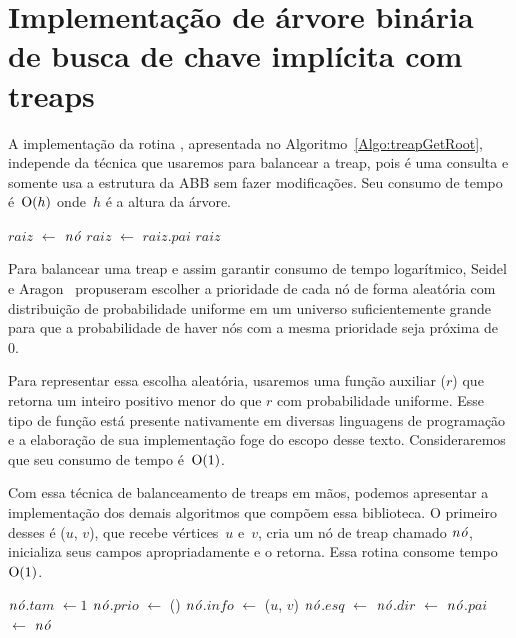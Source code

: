 \section{Implementação de árvore binária de busca de chave implícita com treaps}
\label{sec:imple-treap}
A implementação da rotina \treapGetRoot{}, apresentada no Algoritmo~\ref{Algo:treapGetRoot}, independe da técnica que usaremos para balancear a treap,
pois é uma consulta e somente usa a estrutura da ABB sem fazer modificações.
Seu consumo de tempo é~$\mathrm{O}(h)$ onde~$h$ é a altura da árvore.

\begin{algorithm}[htb]
\caption{\treapGetRoot($\node$)}
\label{Algo:treapGetRoot}
\begin{algorithmic}[1]
\State $raiz$ $\gets$ $\node$
\State  $raiz$ $\gets$  $raiz$.$pai$
\EndWhile
\State \Return $raiz$
\end{algorithmic}
\end{algorithm}

Para balancear uma treap e assim garantir consumo de tempo logarítmico, Seidel e Aragon~\cite{AragonSeidel1996} propuseram escolher a prioridade de cada nó de forma aleatória com distribuição de probabilidade uniforme em um universo suficientemente grande para que a probabilidade de haver nós com a mesma prioridade seja próxima de~$0$.

Para representar essa escolha aleatória, usaremos uma função auxiliar \random($r$) que retorna um inteiro positivo menor do que $r$ com probabilidade uniforme. Esse tipo de função está presente nativamente em diversas linguagens de programação e a elaboração de sua implementação foge do escopo desse texto. Consideraremos que seu consumo de tempo é~$\mathrm{O}(1)$.

Com essa técnica de balanceamento de treaps em mãos, podemos apresentar a implementação dos demais algoritmos que compõem essa biblioteca.
O primeiro desses é \treapCreate($u$, $v$), que recebe vértices~$u$ e~$v$, cria um nó de treap chamado $\node$, inicializa seus campos apropriadamente e o retorna.
Essa rotina consome tempo~$\mathrm{O}(1)$. 

\begin{algorithm}
\caption{\treapCreate($u$, $v$)}
\label{Algo:TREAPbuild}
\begin{algorithmic}[1]
\State $\node$.$tam$ $\gets 1$
\State $\node$.$prio$ $\gets$ \random()
\State $\node$.$info$ $\gets$ ($u$, $v$)
\State $\node$.$esq$ $\gets$ $\node$.$dir$ $\gets$ $\node$.$pai$ $\gets$ \Nil
\State \Return $\node$
\end{algorithmic}
\end{algorithm}

